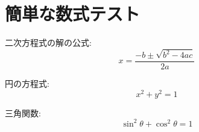 \documentclass{article}
\begin{document}
\section{簡単な数式テスト}

二次方程式の解の公式:
\[x = \frac{-b \pm \sqrt{b^2 - 4ac}}{2a}\]

円の方程式:
\[x^2 + y^2 = 1\]

三角関数:
\[\sin^2\theta + \cos^2\theta = 1\]
\end{document}
